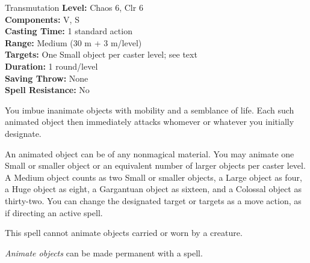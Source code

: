 {Transmutation}
{
	\textbf{Level:}
	Chaos 6, Clr 6\\
	\textbf{Components:}
	V, S\\
	\textbf{Casting Time:}
	1 standard action\\
	\textbf{Range:}
	Medium (30 m + 3 m/level)\\
	\textbf{Targets:}
	One Small object per caster level; see text\\
	\textbf{Duration:}
	1 round/level\\
	\textbf{Saving Throw:}
	None\\
	\textbf{Spell Resistance:}
	No\\
}
{
	You imbue inanimate objects with mobility and a semblance of life. Each such animated object then immediately attacks whomever or whatever you initially designate.

	An animated object can be of any nonmagical material. You may animate one Small or smaller object or an equivalent number of larger objects per caster level. A Medium object counts as two Small or smaller objects, a Large object as four, a Huge object as eight, a Gargantuan object as sixteen, and a Colossal object as thirty-two. You can change the designated target or targets as a move action, as if directing an active spell.

	This spell cannot animate objects carried or worn by a creature.

	\emph{Animate objects} can be made permanent with a  spell.

}
